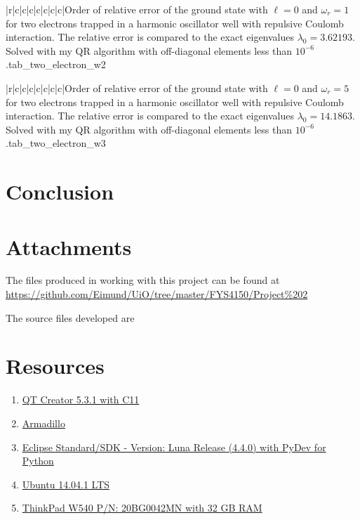 \documentclass[11pt,english,a4paper]{article}
\begin{document}
\begin{flushleft}
\begin{tabell}{|r|c|c|c|c|c|c|c|}{\small}{}{}{Order of relative error of the ground state with $\ell = 0$ and $\omega_r = 1$ for two electrons trapped in a harmonic oscillator well with repulsive Coulomb interaction. The relative error is compared to the exact eigenvalues  $\lambda_0 = 3.62193$. Solved with my QR algorithm with off-diagonal elements less than $10^{-6}$.}{tab_two_electron_w2}
\end{tabell}

\begin{tabell}{|r|c|c|c|c|c|c|c|}{\small}{}{}{Order of relative error of the ground state with $\ell = 0$ and $\omega_r = 5$ for two electrons trapped in a harmonic oscillator well with repulsive Coulomb interaction. The relative error is compared to the exact eigenvalues  $\lambda_0 = 14.1863$. Solved with my QR algorithm with off-diagonal elements less than $10^{-6}$.}{tab_two_electron_w3}
\end{tabell}

\newpage

\section{Conclusion}

\section{Attachments}

The files produced in working with this project can be found at \href{https://github.com/Eimund/UiO/tree/master/FYS4150/Project\%202}{https://github.com/Eimund/UiO/tree/master/FYS4150/Project\%202} \linebreak

The source files developed are

\section{Resources}

\begin{enumerate}
\item{\href{http://qt-project.org/downloads}{QT Creator 5.3.1 with C11}}
\item{\href{http://arma.sourceforge.net/}{Armadillo}}
\item{\href{https://www.eclipse.org/downloads/}{Eclipse Standard/SDK  - Version: Luna Release (4.4.0) with PyDev for Python}}
\item{\href{http://www.ubuntu.com/download/desktop}{Ubuntu 14.04.1 LTS}}
\item{\href{http://shop.lenovo.com/no/en/laptops/thinkpad/w-series/w540/#tab-reseller}{ThinkPad W540 P/N: 20BG0042MN with 32 GB RAM}}
\end{enumerate}


\end{flushleft}
\end{document}
